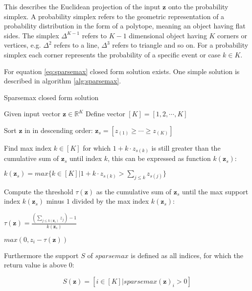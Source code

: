 \documentclass[../main.tex]{subfiles}
\begin{document}
This describes the Euclidean projection of the input $\mathbf{z}$ onto the probability simplex. A probability simplex refers to the geometric representation of a probability distribution in the form of a polytope, meaning an object having flat sides. The simplex $\Delta ^ {K-1}$ refers to $K-1$ dimensional object having $K$ corners or vertices, e.g. $\Delta ^ {2}$ refers to a line, $\Delta ^ {3}$ refers to triangle and so on. For a probability simplex each corner represents the probability of a specific event or case $k\in K$. 
\newline

For equation \ref{eq:sparsemax} closed form solution exists. One simple solution is described in algorithm \ref{alg:sparsemax}.

\begin{algorithm}[H]
    \caption{Sparsemax closed form solution \cite{martins_softmax_2016}} \label{alg:sparsemax}
    \begin{algorithmic}[1]
    
        \Require Given input vector $\mathbf{z} \in \mathbb{R}^K$
        \Require Define vector $[K] = [1,2,\cdots,K]$

        \State Sort $\mathbf{z}$ in in descending order: $\mathbf{z}_{s}=[z_{(1)} \ge \cdots \ge z_{(K)}]$
        
        \State Find max index $k \in [K]$ for which $1+k\cdot z_{s(k)}$ is still greater than the cumulative sum of $\mathbf{z}_{s}$ until index $k$, this can be expressed as function $k(\mathbf{z}_{s})$:

        $k(\mathbf{z}_s)=max \Big\{ k \in [K] | 1+k\cdot z_{s(k)} > \sum_{j \le k} z_{s (j)} \Big\}$

        \State Compute the threshold $\tau(\mathbf{z})$ as the cumulative sum of $\mathbf{z}_{s}$ until the max support index $k(\mathbf{z}_{s})$ minus $1$ divided by the max index $k(\mathbf{z}_{s})$:
        
        $\tau(\mathbf{z})=\frac{(\sum_{j \le k(\mathbf{z}_{s})}z_{j}) - 1}{k(\mathbf{z}_{s})}$
        
        \State \Return $max(0, z_i - \tau(\mathbf{z}))$   

    \end{algorithmic}
\end{algorithm}

Furthermore the support $S$ of $sparsemax$ is defined as all indices, for which the return value is above 0: 

\begin{equation}
    S(\mathbf{z}) = [i \in [K] | sparsemax(\mathbf{z})_i > 0]
\end{equation}
\end{document}
